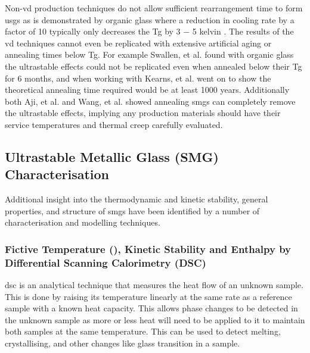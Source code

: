 \documentclass[a4paper,12pt,oneside]{report}%
\begin{document}
Non-\gls{vd} production techniques do not allow sufficient rearrangement time to form \glspl{usg} as is demonstrated by organic glass where a reduction in cooling rate by a factor of 10 typically only decreases the \gls{Tg} by 3 $-$ 5 kelvin \cite{Ediger1996, Dawson2011}.  The results of the \gls{vd} techniques cannot even be replicated with extensive artificial aging or annealing times below \gls{Tg}. For example Swallen, et al. \cite{Swallen2007} found with organic glass  the ultrastable effects could not be replicated even when annealed below their \gls{Tg} for 6 months, and when working with Kearns, et al. \cite{Kearns2008} went on to show the theoretical annealing time required would be at least 1000 years. Additionally both Aji, et al. \cite{Aji2013} and Wang, et al. \cite{Wang2014} showed annealing \glspl{smg} can completely remove the ultrastable effects, implying any production materials should have their service temperatures and thermal creep carefully evaluated.

\subsection{Ultrastable Metallic Glass (SMG) Characterisation}
Additional insight into the thermodynamic and kinetic stability, general properties, and structure of \glspl{smg} have been identified by a number of characterisation and modelling techniques. 

\subsubsection{Fictive Temperature (\Tf), Kinetic Stability and Enthalpy by Differential Scanning Calorimetry (DSC)}
\Gls{dsc} is an analytical technique that measures the heat flow of an unknown sample. This is done by raising its temperature linearly at the same rate as a reference sample with a known heat capacity. This allows phase changes to be detected in the unknown sample as more or less heat will need to be applied to it to maintain both samples at the same temperature. This can be used to detect melting, crystallising, and other changes like glass transition in a sample.
\end{document}
